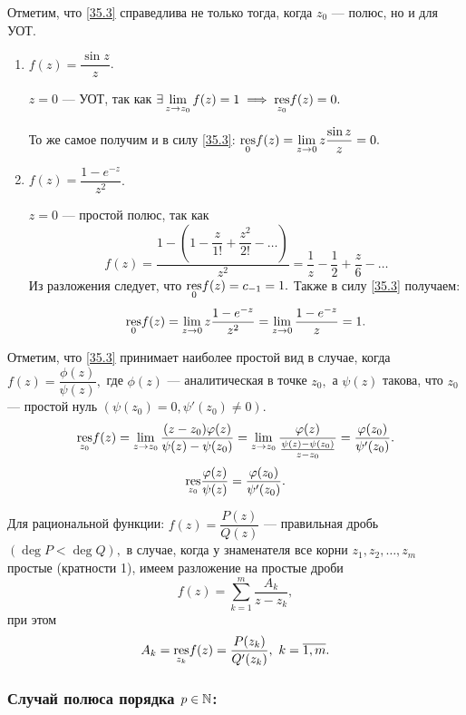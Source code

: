 \documentclass[../../main.tex]{subfiles}
\begin{document}
	Отметим, что \eqref{35.3} справедлива не только тогда, когда $z_0$ --- полюс,
	но и для УОТ.
	
	\begin{examples}
		\;
		
		\begin{enumerate}
			\item 
			$f(z) = \dfrac{\sin z}{z}$.
			
			$ z = 0 $ --- УОТ, так как 
			$\exists \lim\limits_{z\to z_0} f(z) = 1 \implies \underset{z_0}{\operatorname{res}}f(z) 
			= 0.$
			
			То же самое получим и в силу \eqref{35.3}: 
			$\underset{0}{\operatorname{res}}f(z)= \lim\limits_{z\to 0}z \dfrac{\sin z}{z} = 0.$
			\item
			$f(z) = \dfrac{1-e^{-z}}{z^2}$.
			
			$z = 0$ --- простой полюс, так как 
			\[
				f(z) = \dfrac{1- \left(1-\dfrac{z}{1!}+\dfrac{z^2}{2!}-\ldots\right)}{z^2} 
				= \frac{1}{z} - \frac{1}{2} + \frac{z}{6}- \ldots
			\]
			Из разложения следует, что $\underset{0}{\operatorname{res}}f(z) = c_{-1} = 1.$ Также в 
			силу \eqref{35.3} получаем:
			\[
			\underset{0}{\operatorname{res}}f(z) = \lim_{z\to 0}z\dfrac{1-e^{-z}}{z^2} =
			 \lim_{z\to 0}\dfrac{1-e^{-z}}{z} = 1.
			\]
		\end{enumerate}
	\end{examples}
	
	Отметим, что \eqref{35.3} принимает наиболее простой вид в случае, когда 
	$f(z) = \dfrac{\phi(z)}{\psi(z)},$ где 
	$\phi(z)$ --- аналитическая в точке $z_0,$ а $\psi(z)$ такова, что $z_0$ --- 
	простой нуль $({\psi(z_0) = 0, \psi'(z_0) \ne 0}).$
	\[
		\underset{z_0}{\operatorname{res}} f(z) = \lim\limits_{z\to 
		z_0}\frac{(z-z_0)\varphi(z)}{\psi(z) - \psi(z_0)} = 
		\lim\limits_{z\to z_0}\frac{\varphi(z)}{\frac{\psi(z) - \psi(z_0)}{z - z_0}} 
		= \frac{\varphi(z_0)}{\psi'(z_0)}.
	\]
	\begin{equation}\label{35.4}
		\underset{z_0}{\operatorname{res}} \frac{\varphi(z)}{\psi(z)} = 
		\frac{\varphi(z_0)}{\psi'(z_0)}.
	\end{equation}
	
	Для рациональной функции: $f(z) = \dfrac{P(z)}{Q(z)}$ --- правильная 
	дробь $(\deg P < \deg Q),$ в случае, когда у знаменателя все корни $z_1, z_2, 
	\ldots, z_m$ простые (кратности 1), имеем разложение на простые дроби 
	\[
		f(z) = \sum_{k=1}^{m}\frac{A_k}{z-z_k},
	\]
	при этом
	\[
		A_k = 	\underset{z_k}{\res} f(z) = \dfrac{P(z_k)}{Q'(z_k)},\ 
		k = \overline{1, m}.
	\]
	
	\subsubsection*{Случай полюса порядка $p \in \mathbb{N}$:}
	
\end{document}
